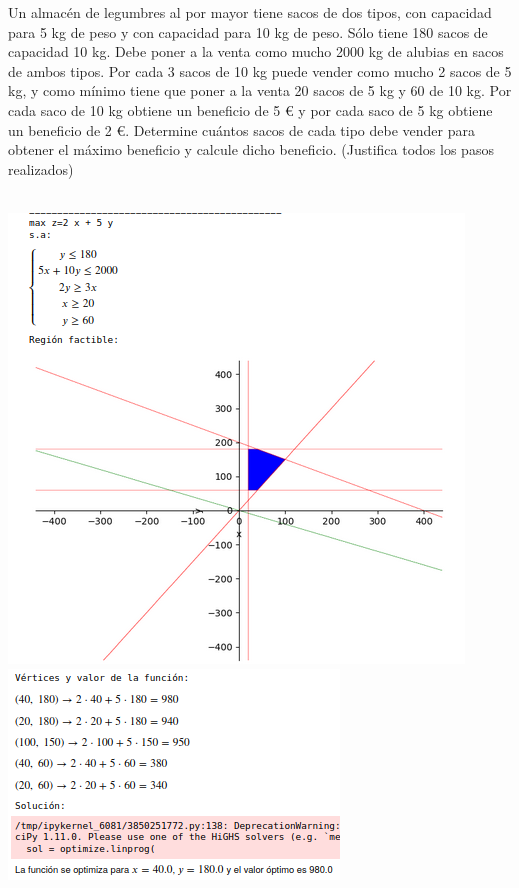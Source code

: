\documentclass[addpoints,spanish, 12pt,a4paper]{exam}
\begin{document}
\begin{questions}
\question Un almacén de legumbres al por mayor tiene sacos de dos tipos, con
capacidad para 5 kg de peso y con capacidad para 10 kg de peso. Sólo tiene 180 sacos de capacidad
10 kg. Debe poner a la venta como mucho 2000 kg de alubias en sacos de ambos tipos. Por cada
3 sacos de 10 kg puede vender como mucho 2 sacos de 5 kg, y como mínimo tiene que poner a la
venta 20 sacos de 5 kg y 60 de 10 kg. Por cada saco de 10 kg obtiene un beneficio de 5 € y por
cada saco de 5 kg obtiene un beneficio de 2 €. Determine cuántos sacos de cada tipo debe vender para obtener el máximo beneficio y calcule dicho beneficio. (Justifica todos los pasos realizados)
\begin{solution}\\
\includegraphics[scale=0.5]{prglin1}\\
\includegraphics[scale=0.8]{prglin2}
\end{solution}


\end{questions}
\end{document}

